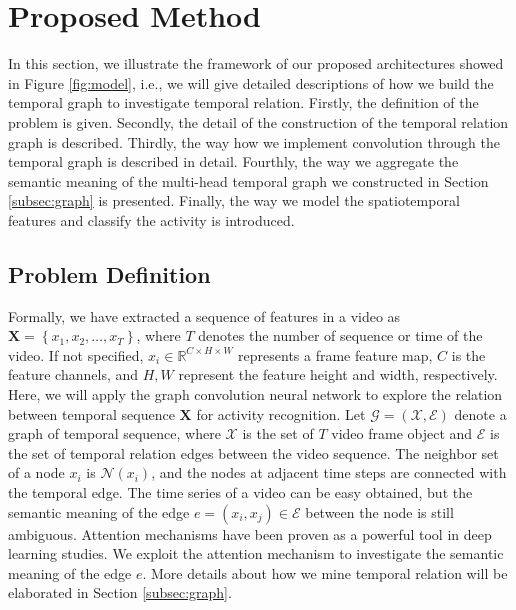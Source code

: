 \documentclass[conference,compsoc]{IEEEtran}
\begin{document}
\section{Proposed Method}
\label{sec:method}
    In this section, we illustrate the framework of our proposed architectures showed in Figure \ref{fig:model}, i.e., we will give detailed descriptions of how we build the temporal graph to investigate temporal relation. Firstly, the definition of the problem is given. Secondly, the detail of the construction of the temporal relation graph is described. Thirdly, the way how we implement convolution through the temporal graph is described in detail. Fourthly, the way we aggregate the semantic meaning of the multi-head temporal graph we constructed in Section \ref{subsec:graph} is presented. Finally, the way we model the spatiotemporal features and classify the activity is introduced. 
    
    
\subsection{Problem Definition}
    Formally, we have extracted a sequence of features in a video as $\mathbf{X} = \left\{ x_1, x_2, \ldots, x_T \right\}$, where $T$ denotes the number of sequence or time of the video. If not specified, $x_i \in \mathbb{R}^{C \times H \times W}$ represents a frame feature map, $C$ is the feature channels, and $H, W$ represent the feature height and width, respectively. Here, we will apply the graph convolution neural network to explore the relation between temporal sequence $\mathbf{X}$ for activity recognition. Let $\mathcal{G} = \left ( \mathcal{X}, \mathcal{E} \right)$ denote a graph of temporal sequence, where $\mathcal{X}$ is the set of $T$ video frame object and $\mathcal{E}$ is the set of temporal relation edges between the video sequence. The neighbor set of a node $x_{i}$ is $\mathcal{N}\left ( x_{i} \right)$, and the nodes at adjacent time steps are connected with the temporal edge. The time series of a video can be easy obtained, but the semantic meaning of the edge $e = \left ( x_{i}, x_{j}\right ) \in \mathcal{E}$ between the node is still ambiguous. Attention mechanisms have been proven as a powerful tool in deep learning studies. We exploit the attention mechanism to investigate the semantic meaning of the edge $e$. More details about how we mine temporal relation will be elaborated in Section \ref{subsec:graph}.
    
\end{document}
